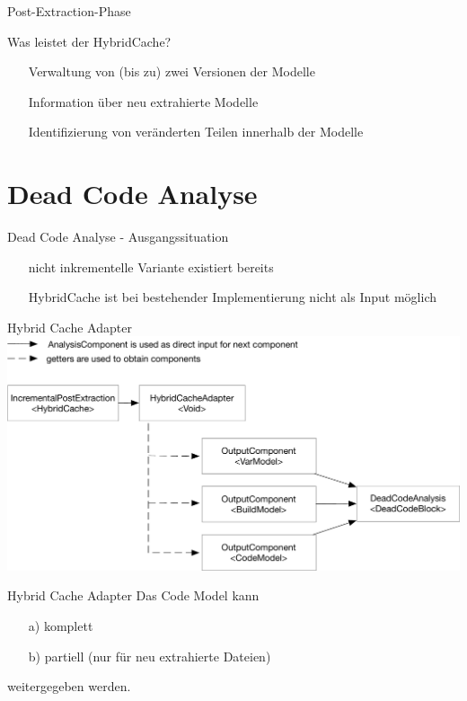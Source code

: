 \documentclass[aspectratio=43, noserifmath]{beamer}
\begin{document}
\begin{frame}[containsverbatim]{Post-Extraction-Phase}

Was leistet der HybridCache?
\begin{itemize}
    \item[\textbullet] Verwaltung von (bis zu) zwei Versionen der Modelle
    \item[\textbullet] Information \"uber neu extrahierte Modelle
    \item[\textbullet] Identifizierung von ver\"anderten Teilen innerhalb der Modelle
\end{itemize}
\end{frame}

\section{Dead Code Analyse}
\begin{frame}{Dead Code Analyse - Ausgangssituation}

\begin{itemize}
    \item[\textbullet] nicht inkrementelle Variante existiert bereits
    \item[\textbullet] HybridCache ist bei bestehender Implementierung nicht als Input m\"oglich
\end{itemize}
\end{frame}


\begin{frame}{Hybrid Cache Adapter}
\includegraphics[width=1\textwidth]{image/HybridCacheAdapter.pdf}
\end{frame}

\begin{frame}{Hybrid Cache Adapter}
Das Code Model kann
\begin{itemize}
    \item[a)] komplett
    \item[b)] partiell (nur f\"ur neu extrahierte Dateien)
\end{itemize}
weitergegeben werden.
\end{frame}
\end{document}
